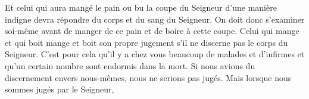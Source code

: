 Et celui qui aura mangé le pain ou bu la coupe du Seigneur d’une manière indigne
	devra répondre du corps et du sang du Seigneur.
On doit donc s’examiner soi-même
	avant de manger de ce pain et de boire à cette coupe.
Celui qui mange et qui boit mange et boit son propre jugement
	s’il ne discerne pas le corps du Seigneur.
C’est pour cela qu’il y a chez vous beaucoup de malades et d’infirmes
	et qu’un certain nombre sont endormis dans la mort.
Si nous avions du discernement envers nous-mêmes,
	nous ne serions pas jugés.
Mais lorsque nous sommes jugés par le Seigneur,\hfill{}
